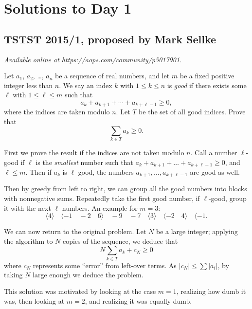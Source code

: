 \documentclass[11pt]{scrartcl}
\begin{document}
\section{Solutions to Day 1}
\subsection{TSTST 2015/1, proposed by Mark Sellke}
\textsl{Available online at \url{https://aops.com/community/p5017901}.}
\begin{mdframed}[style=mdpurplebox,frametitle={Problem statement}]
Let $a_1$, $a_2$, \dots, $a_n$ be a sequence of real numbers,
and let $m$ be a fixed positive integer less than $n$.
We say an index $k$ with $1 \le k \le n$ is \textit{good} if there exists
some $\ell$ with $1 \le \ell \le m$ such that
\[ a_k + a_{k + 1} + \dotsb + a_{k + \ell - 1} \ge 0, \]
where the indices are taken modulo $n$.
Let $T$ be the set of all good indices. Prove that
\[ \sum_{k \in T} a_k \ge 0. \]
\end{mdframed}
First we prove the result if the indices are not taken modulo $n$.
Call a number $\ell$-good if $\ell$ is the \emph{smallest} number
such that $a_k + a_{k+1} + \dots + a_{k+\ell-1} \ge 0$, and $\ell \le m$.
Then if $a_k$ is $\ell$-good,
the numbers $a_{k+1}, \dots, a_{k+\ell-1}$ are good as well.

Then by greedy from left to right,
we can group all the good numbers into blocks with nonnegative sums.
Repeatedly take the first good number,
if $\ell$-good, group it with the next $\ell$ numbers.
An example for $m = 3$:
\[ \langle 4 \rangle
  \quad \langle -1 \quad -2 \quad 6 \rangle
  \quad -9
  \quad -7
  \quad \langle 3 \rangle
  \quad \langle -2 \quad 4 \rangle
  \quad \langle -1. \]

We can now return to the original problem.
Let $N$ be a large integer; applying the algorithm to
$N$ copies of the sequence, we deduce that
\[ N \sum_{k \in T} a_k + c_N \ge 0 \]
where $c_N$ represents some ``error'' from left-over terms.
As $|c_N| \le \sum |a_i|$, by taking $N$ large enough we deduce the problem.

\begin{remark*}
  This solution was motivated by looking at the case $m = 1$,
  realizing how dumb it was, then looking at $m = 2$,
  and realizing it was equally dumb.
\end{remark*}
\pagebreak
\end{document}
